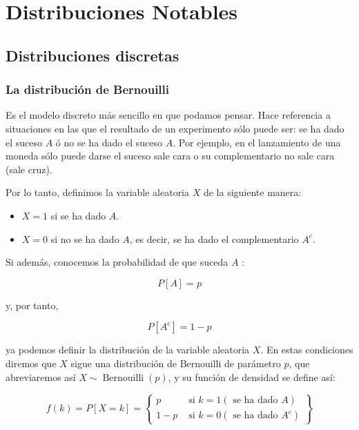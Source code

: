 \documentclass[
]{article}
\providecommand{\tightlist}{%
  \setlength{\itemsep}{0pt}\setlength{\parskip}{0pt}}
\begin{document}
\newpage

\section{Distribuciones Notables}\label{distribuciones-notables}

\subsection{Distribuciones discretas}\label{distribuciones-discretas}

\subsubsection{La distribución de Bernouilli}\label{la-distribuciuxf3n-de-bernouilli}

Es el modelo discreto más sencillo en que podamos pensar. Hace referencia a situaciones en las que el resultado de un experimento sólo puede ser: se ha dado el suceso \(A\) ó no se ha dado el suceso \(A\). Por ejemplo, en el lanzamiento de una moneda sólo puede darse el suceso sale cara o su complementario no sale cara (sale cruz).

Por lo tanto, definimos la variable aleatoria \(X\) de la siguiente manera:

\begin{itemize}
\tightlist
\item
  \(X=1\) si se ha dado \(A\).
\item
  \(X=0\) si no se ha dado \(A\), es decir, se ha dado el complementario \(A^{c}\).
\end{itemize}

Si además, conocemos la probabilidad de que suceda \(A\) :

\[
P[A]=p
\]

y, por tanto,

\[
P\left[A^{c}\right]=1-p
\]

ya podemos definir la distribución de la variable aleatoria \(X\).
En estas condiciones diremos que \(X\) sigue una distribución de Bernouilli de parámetro \(p\), que abreviaremos así \(X \sim \operatorname{Bernouilli}(p)\), y su función de densidad se define así:

\[
f(k)=P[X=k]=\left\{\begin{array}{cc}
p & \text { si } k=1(\text { se ha dado } A) \\
1-p & \text { si } k=0\left(\text { se ha dado } A^{c}\right)
\end{array}\right\}
\]
\end{document}
